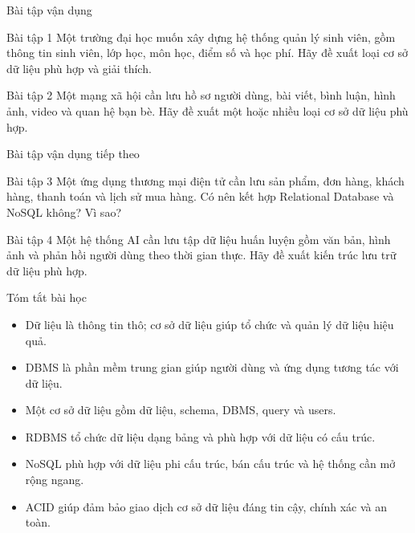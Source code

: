 ﻿\documentclass[aspectratio=169,11pt]{beamer}
\newcommand{\tightlist}{\setlength{\itemsep}{2pt}\setlength{\parskip}{0pt}}
\begin{document}
\begin{frame}{Bài tập vận dụng}
\small
\begin{block}{Bài tập 1}
Một trường đại học muốn xây dựng hệ thống quản lý sinh viên, gồm thông tin sinh viên, lớp học, môn học, điểm số và học phí. Hãy đề xuất loại cơ sở dữ liệu phù hợp và giải thích.
\end{block}

\begin{block}{Bài tập 2}
Một mạng xã hội cần lưu hồ sơ người dùng, bài viết, bình luận, hình ảnh, video và quan hệ bạn bè. Hãy đề xuất một hoặc nhiều loại cơ sở dữ liệu phù hợp.
\end{block}
\end{frame}

\begin{frame}{Bài tập vận dụng tiếp theo}
\small
\begin{block}{Bài tập 3}
Một ứng dụng thương mại điện tử cần lưu sản phẩm, đơn hàng, khách hàng, thanh toán và lịch sử mua hàng. Có nên kết hợp Relational Database và NoSQL không? Vì sao?
\end{block}

\begin{block}{Bài tập 4}
Một hệ thống AI cần lưu tập dữ liệu huấn luyện gồm văn bản, hình ảnh và phản hồi người dùng theo thời gian thực. Hãy đề xuất kiến trúc lưu trữ dữ liệu phù hợp.
\end{block}
\end{frame}

\begin{frame}{Tóm tắt bài học}
\small
\begin{itemize}
\tightlist
  \item Dữ liệu là thông tin thô; cơ sở dữ liệu giúp tổ chức và quản lý dữ liệu hiệu quả.
  \item DBMS là phần mềm trung gian giúp người dùng và ứng dụng tương tác với dữ liệu.
  \item Một cơ sở dữ liệu gồm dữ liệu, schema, DBMS, query và users.
  \item RDBMS tổ chức dữ liệu dạng bảng và phù hợp với dữ liệu có cấu trúc.
  \item NoSQL phù hợp với dữ liệu phi cấu trúc, bán cấu trúc và hệ thống cần mở rộng ngang.
  \item ACID giúp đảm bảo giao dịch cơ sở dữ liệu đáng tin cậy, chính xác và an toàn.
\end{itemize}
\end{frame}
\end{document}
